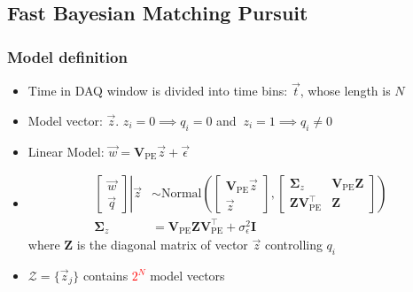 \documentclass{beamer}
\begin{document}
\begin{CJK*}{UTF8}{gbsn}
\section{Fast Bayesian Matching Pursuit}

\begin{frame}
\frametitle{Model definition}
\begin{itemize}
    \item Time in DAQ window is divided into time bins: $\vec{t}$, whose length is $N$
    \item Model vector: $\vec{z}$. $z_i=0\implies q_i=0$ and $\ z_i=1\implies q_i\neq0$
    \item Linear Model: $\vec{w} = \bm{V}_\mathrm{PE}\vec{z} + \vec{\epsilon}$
    \item 
        \begin{align*}
            \left.
            \begin{bmatrix}
                \vec{w} \\
                \vec{q}
            \end{bmatrix}
            \right\vert\vec{z}
            &\sim \mathrm{Normal}\left(
            \begin{bmatrix}
                \bm{V}_\mathrm{PE}\vec{z} \\
                \vec{z}
            \end{bmatrix}, 
            \begin{bmatrix}
                \bm{\Sigma}_z & \bm{V}_\mathrm{PE}\bm{Z} \\
                \bm{Z}\bm{V}_\mathrm{PE}^\intercal & \bm{Z}
            \end{bmatrix}
            \right) \\
            \bm{\Sigma}_z &= \bm{V}_\mathrm{PE}\bm{Z}\bm{V}_\mathrm{PE}^\intercal+\sigma_\epsilon^2\bm{I}
        \end{align*}
    where $\bm{Z}$ is the diagonal matrix of vector $\vec{z}$ controlling $q_i$ 
    \item $\mathcal{Z}=\{\vec{z}_j\}$ contains \textcolor{red}{$2^{N}$} model vectors
\end{itemize}
\end{frame}


\end{CJK*}
\end{document}
